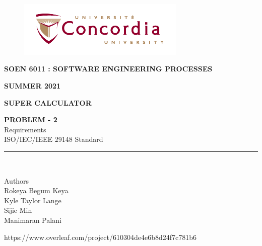 \documentclass[a4paper, 11pt]{report}
\begin{document}
\begin{titlepage}
\vspace*{0.7in}
\begin{center}
\begin{figure}[htb]
\begin{center}
\includegraphics[width=8cm]{univ_logo}
\end{center}
\end{figure}
\vspace*{0.3in}
\begin{Large}
\textbf{SOEN 6011 : SOFTWARE ENGINEERING PROCESSES} \\
\end{Large}
\vspace*{0.1in}
\begin{Large}
\textbf{SUMMER 2021} \\
\end{Large}
\vspace*{0.9in}
\begin{Large}
\textbf{SUPER CALCULATOR} \\
\end{Large}
\vspace*{0.9in}
\begin{Large} 


\textbf{PROBLEM - 2} \\
Requirements\\\footnotesize{ISO/IEC/IEEE} 29148 Standard \\
\end{Large}
\vspace*{0.9in}
\rule{80mm}{0.1mm}\\
\vspace*{0.1in}
\begin{large}
Authors \\
\vspace*{0.1in}
Rokeya Begum Keya\\
\vspace*{0.1in}
Kyle Taylor Lange\\
\vspace*{0.1in}
Sijie Min\\
\vspace*{0.1in}
Manimaran Palani\\ 
\vspace*{0.3in}
\date{\normalsize\today} 
\end{large}
\end{center}
\begin{center}
https://www.overleaf.com/project/610304de4e6b8d24f7c781b6\end{center}
\end{titlepage}
\end{document}
